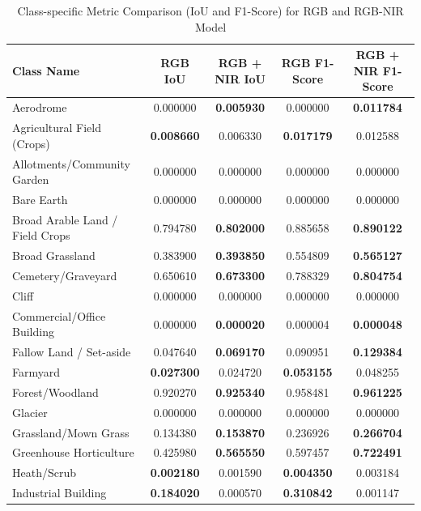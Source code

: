 \documentclass{report}
\begin{document}
\begin{table}[H]
 \begin{adjustwidth}{-2cm}{}
\centering
\caption{Class-specific Metric Comparison (IoU and F1-Score) for RGB and RGB-NIR Model}
\label{tab:class_metrics_comparison_combined}
\begin{tabular}{l S[table-format=1.6, detect-weight] S[table-format=1.6, detect-weight] | S[table-format=1.6, detect-weight] S[table-format=1.6, detect-weight]}
\toprule
Class Name & {RGB IoU} & {RGB + NIR IoU} & {RGB F1-Score} & {RGB + NIR F1-Score} \\
\midrule
Aerodrome & 0.000000 & \textbf{0.005930} & 0.000000 & \textbf{0.011784} \\
Agricultural Field (Crops) & \textbf{0.008660} & 0.006330 & \textbf{0.017179} & 0.012588 \\
Allotments/Community Garden & 0.000000 & 0.000000 & 0.000000 & 0.000000 \\
Bare Earth & 0.000000 & 0.000000 & 0.000000 & 0.000000 \\
Broad Arable Land / Field Crops & 0.794780 & \textbf{0.802000} & 0.885658 & \textbf{0.890122} \\
Broad Grassland & 0.383900 & \textbf{0.393850} & 0.554809 & \textbf{0.565127} \\
Cemetery/Graveyard & 0.650610 & \textbf{0.673300} & 0.788329 & \textbf{0.804754} \\
Cliff & 0.000000 & 0.000000 & 0.000000 & 0.000000 \\
Commercial/Office Building & 0.000000 & \textbf{0.000020} & 0.000004 & \textbf{0.000048} \\
Fallow Land / Set-aside & 0.047640 & \textbf{0.069170} & 0.090951 & \textbf{0.129384} \\
Farmyard & \textbf{0.027300} & 0.024720 & \textbf{0.053155} & 0.048255 \\
Forest/Woodland & 0.920270 & \textbf{0.925340} & 0.958481 & \textbf{0.961225} \\
Glacier & 0.000000 & 0.000000 & 0.000000 & 0.000000 \\
Grassland/Mown Grass & 0.134380 & \textbf{0.153870} & 0.236926 & \textbf{0.266704} \\
Greenhouse Horticulture & 0.425980 & \textbf{0.565550} & 0.597457 & \textbf{0.722491} \\
Heath/Scrub & \textbf{0.002180} & 0.001590 & \textbf{0.004350} & 0.003184 \\
Industrial Building & \textbf{0.184020} & 0.000570 & \textbf{0.310842} & 0.001147 \\

\end{tabular}
\end{adjustwidth}
\end{table}
\end{document}
